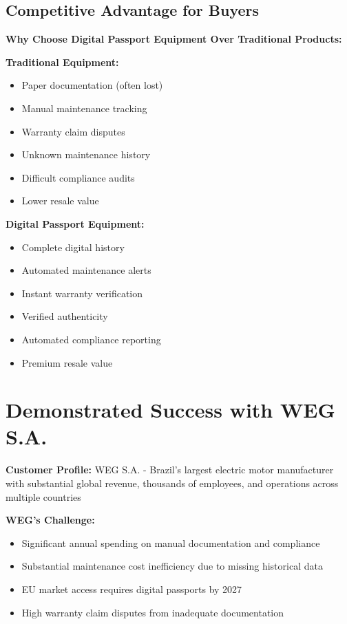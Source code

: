 \documentclass[11pt,a4paper]{article}
\begin{document}
\subsection{Competitive Advantage for Buyers}

\textbf{Why Choose Digital Passport Equipment Over Traditional Products:}

\begin{multicols}{2}
\textbf{Traditional Equipment:}
\begin{itemize}[leftmargin=0.3cm]
    \item Paper documentation (often lost)
    \item Manual maintenance tracking
    \item Warranty claim disputes
    \item Unknown maintenance history
    \item Difficult compliance audits
    \item Lower resale value
\end{itemize}

\textbf{Digital Passport Equipment:}
\begin{itemize}[leftmargin=0.3cm]
    \item Complete digital history
    \item Automated maintenance alerts
    \item Instant warranty verification
    \item Verified authenticity
    \item Automated compliance reporting
    \item Premium resale value
\end{itemize}
\end{multicols}

\section{Demonstrated Success with WEG S.A.}

\textbf{Customer Profile:} WEG S.A. - Brazil's largest electric motor manufacturer with substantial global revenue, thousands of employees, and operations across multiple countries

\textbf{WEG's Challenge:}
\begin{itemize}[leftmargin=0.5cm]
    \item Significant annual spending on manual documentation and compliance
    \item Substantial maintenance cost inefficiency due to missing historical data
    \item EU market access requires digital passports by 2027
    \item High warranty claim disputes from inadequate documentation
\end{itemize}
\end{document}
